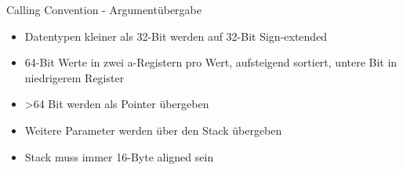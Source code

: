\documentclass[
  german,            %
  aspectratio=169,    %
]{tumbeamer}
\begin{document}
  \begin{frame}[c]{Calling Convention - Argumentübergabe}                                    
	\begin{itemize}
	  \item Datentypen kleiner als 32-Bit werden auf 32-Bit Sign-extended
	  \item 64-Bit Werte in zwei a-Registern pro Wert, aufsteigend sortiert, untere Bit in niedrigerem Register
	  \item >64 Bit werden als Pointer übergeben
	  \item Weitere Parameter werden über den Stack übergeben
	  \item Stack muss immer 16-Byte aligned sein
   \end{itemize}                                          
  \end{frame}
  
\end{document}
